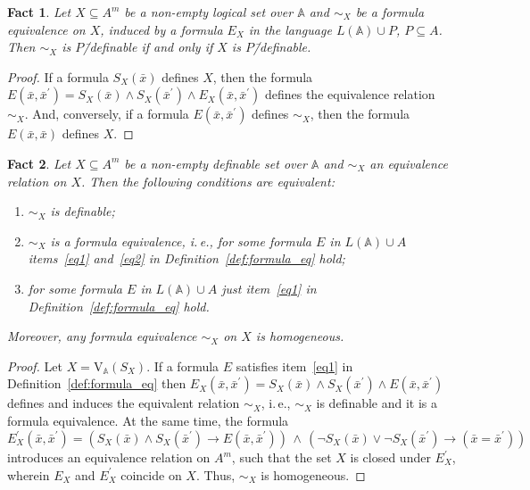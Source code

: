 \documentclass[12pt]{article}
\newtheorem{fact}{Fact}
\theoremstyle{definition}
\def\MA{{\mathbb{A}}}
\def\V{{\mathrm{V}}}
\begin{document}
\begin{fact}
Let $X\subseteq A^m$ be a non-empty logical set over $\MA$ and $\sim_X$ be a formula equivalence on $X$, induced by a formula $E_X$ in the language $L(\MA)\cup P$, $P\subseteq A$. Then $\sim_X$ is $P$\=/definable if and only if $X$ is $P$\=/definable.
\end{fact}

\begin{proof}
If a formula $S_X(\bar x)$ defines $X$, then the formula $E(\bar x, \bar x^\prime)=S_X(\bar x)\wedge S_X(\bar x^\prime)\wedge E_X(\bar x,\bar x^\prime)$ defines the equivalence relation $\sim_X$. And, conversely, if a formula $E(\bar x,\bar x^\prime)$ defines $\sim_X$, then the formula $E(\bar x,\bar x)$ defines $X$.
\end{proof}

\begin{fact}\label{rem2}
Let $X\subseteq A^m$ be a non-empty definable set over $\MA$ and $\sim_X$ an equivalence relation on $X$. Then the following conditions are equivalent:
\begin{enumerate}[label=\arabic*)]
\item $\sim_X$ is definable;
\item $\sim_X$ is a formula equivalence, i.\,e., for some formula $E$ in $L(\MA)\cup A$  items~\ref{eq1} and~\ref{eq2} in Definition~\ref{def:formula_eq} hold;
\item for some formula $E$ in $L(\MA)\cup A$ just item~\ref{eq1} in Definition~\ref{def:formula_eq} hold.
\end{enumerate}
Moreover, any formula equivalence $\sim_X$ on $X$ is homogeneous.
\end{fact}

\begin{proof}
Let $X=\V_\MA(S_X)$. 
If a formula $E$ satisfies item~\ref{eq1} in Definition~\ref{def:formula_eq} then $E_X(\bar x,\bar x^\prime)=S_X(\bar x)\wedge S_X(\bar x^\prime)\wedge E(\bar x,\bar x^\prime)$  defines and induces the equivalent relation $\sim_X$, i.\,e., $\sim_X$ is definable and it is a formula equivalence. 
At the same time, the formula
$$
E^{\prime}_X(\bar x, \bar x^\prime)= (S_X(\bar x)\wedge S_X(\bar x^\prime) \longrightarrow E(\bar x,\bar x^\prime)) \,\wedge\,(\neg S_X(\bar x)\vee \neg S_X(\bar x^\prime) \longrightarrow (\bar x=\bar x^\prime))
$$
introduces an equivalence relation on $A^m$, such that the set $X$ is closed under $E^{\prime}_X$, wherein $E_X$ and $E^{\prime}_X$ coincide on $X$. Thus, $\sim_X$ is homogeneous.
\end{proof}
\end{document}
